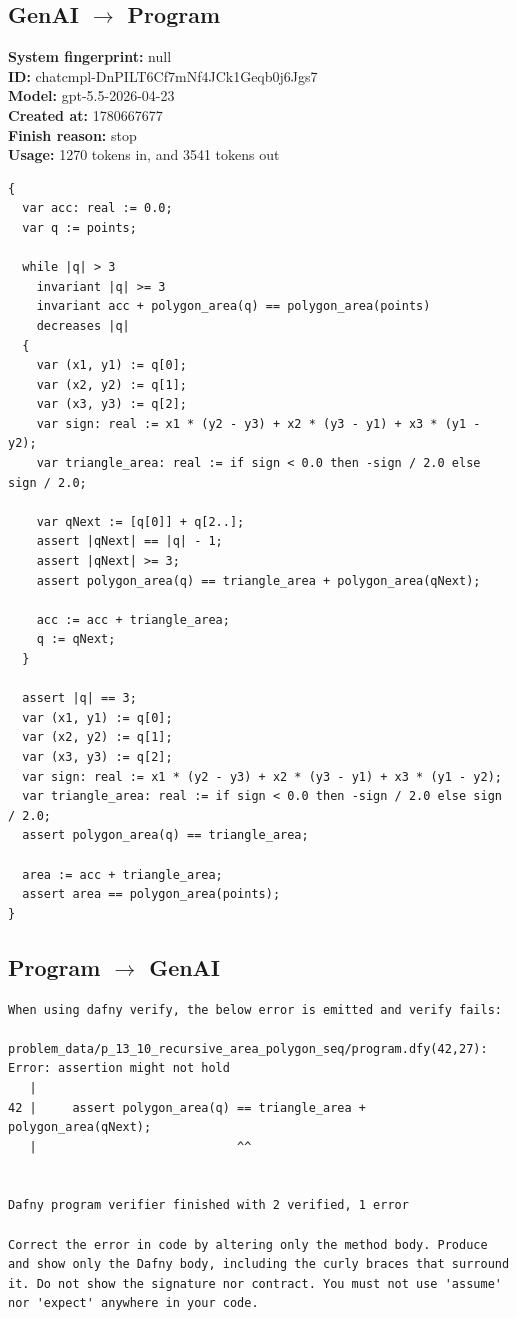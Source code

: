 \documentclass{article}
\begin{document}
\subsection*{GenAI $\rightarrow$ Program}
\textbf{System fingerprint: }null
\\\textbf{ID: }chatcmpl-DnPILT6Cf7mNf4JCk1Geqb0j6Jgs7
\\\textbf{Model: }gpt-5.5-2026-04-23
\\\textbf{Created at: }1780667677
\\\textbf{Finish reason: }stop
\\\textbf{Usage: }1270 tokens in, and 3541 tokens out
\begin{lstlisting}
{
  var acc: real := 0.0;
  var q := points;

  while |q| > 3
    invariant |q| >= 3
    invariant acc + polygon_area(q) == polygon_area(points)
    decreases |q|
  {
    var (x1, y1) := q[0];
    var (x2, y2) := q[1];
    var (x3, y3) := q[2];
    var sign: real := x1 * (y2 - y3) + x2 * (y3 - y1) + x3 * (y1 - y2);
    var triangle_area: real := if sign < 0.0 then -sign / 2.0 else sign / 2.0;

    var qNext := [q[0]] + q[2..];
    assert |qNext| == |q| - 1;
    assert |qNext| >= 3;
    assert polygon_area(q) == triangle_area + polygon_area(qNext);

    acc := acc + triangle_area;
    q := qNext;
  }

  assert |q| == 3;
  var (x1, y1) := q[0];
  var (x2, y2) := q[1];
  var (x3, y3) := q[2];
  var sign: real := x1 * (y2 - y3) + x2 * (y3 - y1) + x3 * (y1 - y2);
  var triangle_area: real := if sign < 0.0 then -sign / 2.0 else sign / 2.0;
  assert polygon_area(q) == triangle_area;

  area := acc + triangle_area;
  assert area == polygon_area(points);
}
\end{lstlisting}
\subsection*{Program $\rightarrow$ GenAI}
\begin{lstlisting}
When using dafny verify, the below error is emitted and verify fails:

problem_data/p_13_10_recursive_area_polygon_seq/program.dfy(42,27): Error: assertion might not hold
   |
42 |     assert polygon_area(q) == triangle_area + polygon_area(qNext);
   |                            ^^


Dafny program verifier finished with 2 verified, 1 error

Correct the error in code by altering only the method body. Produce and show only the Dafny body, including the curly braces that surround it. Do not show the signature nor contract. You must not use 'assume' nor 'expect' anywhere in your code.
\end{lstlisting}
\end{document}
